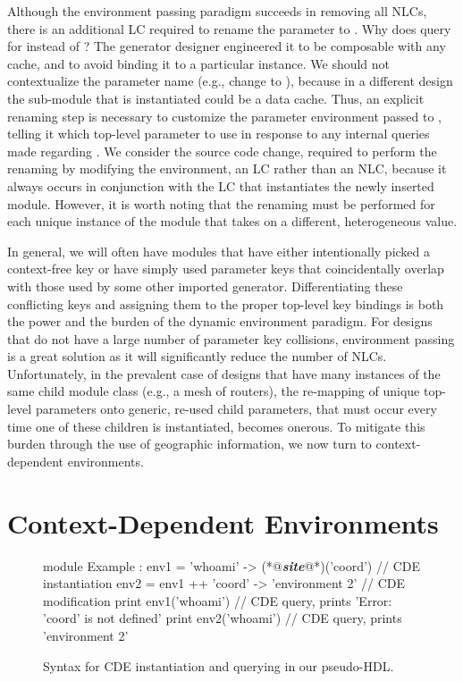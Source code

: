 Although the environment passing paradigm succeeds in removing all NLCs,
there is an additional LC required to rename the  parameter to .
Why does  query for  instead of ?
The generator designer engineered it to be composable with any cache, and to avoid binding it to a particular instance.
We should not contextualize the parameter name (e.g., change  to ),
because in a different design the sub-module that is instantiated could be a data cache. 
Thus, an explicit renaming step is necessary to customize the parameter environment passed to , telling it which top-level parameter to use
in response to any internal queries made regarding .
We consider the source code change, required to perform the renaming by modifying the environment, an LC rather than an NLC, because it always occurs in conjunction
with the LC that instantiates the newly inserted module.
However, it is worth noting that the renaming must be performed for each unique instance of the module that takes on a different, heterogeneous value.

In general, we will often have modules that have either intentionally picked a context-free key or have simply used parameter keys that coincidentally overlap with those
used by some other imported generator.
Differentiating these conflicting keys and assigning them to the proper top-level key bindings is both the power and the burden of the dynamic environment paradigm.
For designs that do not have a large number of parameter key collisions, environment passing is a great solution as it will significantly reduce the number of NLCs. 
Unfortunately, in the prevalent case of designs that have many instances of the same child module class (e.g., a mesh of routers), the re-mapping of unique top-level parameters onto generic, re-used child parameters,
that must occur every time one of these children is instantiated, becomes onerous.
To mitigate this burden through the use of geographic information, we now turn to context-dependent environments.

\section{Context-Dependent Environments}
\label{sec:cde}

\begin{figure}
\centering
\begin{phdl}
module Example :
  env1 = {'whoami' -> (*@\textcolor[rgb]{1,0.5,0}{\textbf{\textit{site}}}@*)('coord')}                // CDE instantiation
  env2 = env1 ++ {'coord' -> 'environment 2'} // CDE modification
  print env1('whoami')                        // CDE query, prints 'Error: 'coord' is not defined'
  print env2('whoami')                        // CDE query, prints 'environment 2'
\end{phdl}
\caption{Syntax for CDE instantiation and querying in our pseudo-HDL.}
\label{fig:cde-phdl}
\end{figure}

